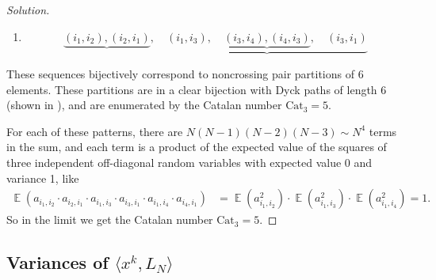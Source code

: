 \documentclass[letterpaper,11pt,oneside,reqno]{amsart}
\numberwithin{equation}{section}
\DeclareMathOperator{\EE}{\mathbb{E}}
\theoremstyle{definition}
\begin{document}
\begin{proof}[Solution]
\begin{enumerate}
	\item
	\begin{equation*}
	\underbrace{ ( i_1, i_2 ) , ( i_2 , i_1 ) } , \quad \underbrace{ ( i_1, i_3 ) , \quad \underbrace{ ( i_3, i_4 ) , ( i_4, i_3 ) } , \quad ( i_3, i_1 ) }
	\end{equation*}

	\end{enumerate}

	These sequences bijectively correspond to noncrossing pair partitions of 6 elements.
	These partitions are in a clear bijection with Dyck paths of length 6
	(shown in ), and are enumerated by the Catalan number $\mathrm{Cat}_3=5$.

	For each of these patterns, there are $ N ( N - 1 ) ( N - 2 ) ( N - 3 ) \sim N^4 $ terms in the sum, and each term is a product of the expected value of the squares of three independent off-diagonal random variables with expected value 0 and variance 1, like
	\begin{align*}
	\EE ( a_{ i_1, i_2 } \cdot a_{ i_2 , i_1 } \cdot a_{ i_1, i_3 } \cdot a_{ i_3, i_1 } \cdot a_{ i_1, i_4 } \cdot a_{ i_4, i_1 } ) &= \EE( a_{ i_1, i_2 }^2 ) \cdot \EE( a_{ i_1, i_3 }^2 ) \cdot \EE( a_{ i_1, i_4 }^2 ) = 1.
	\end{align*}
	So in the limit we get the Catalan number $ \mathrm{Cat}_3 = 5 $.
\end{proof}


\subsection{Variances of $\langle x^k,L_N\rangle$} %
\label{sub:variances_langle_x_k_l_nrangleto0_}
\end{document}
